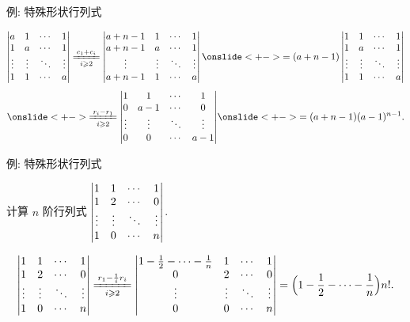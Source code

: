 \begin{frame}{例: 特殊形状行列式}
	\onslide<+->
	\begin{solution}
		\[\detm{
			a&1&\cdots&1\\
			1&a&\cdots&1\\
			\vdots&\vdots&\ddots&\vdots\\
			1&1&\cdots&a
		}\xeq[i\ge2]{c_1+c_i}\detm{
			a+n-1&1&\cdots&1\\
			a+n-1&a&\cdots&1\\
			\vdots&\vdots&\ddots&\vdots\\
			a+n-1&1&\cdots&a
		}
		\onslide<+->{=(a+n-1)\detm{
			1&1&\cdots&1\\
			1&a&\cdots&1\\
			\vdots&\vdots&\ddots&\vdots\\
			1&1&\cdots&a
		}}\]\[
		\onslide<+->{\xeq[i\ge2]{r_i-r_1}\detm{
			1&1&\cdots&1\\
			0&a-1&\cdots&0\\
			\vdots&\vdots&\ddots&\vdots\\
			0&0&\cdots&a-1
		}}
		\onslide<+->{=(a+n-1)(a-1)^{n-1}.}
		\]
	\end{solution}
\end{frame}


\begin{frame}{例: 特殊形状行列式}
	\onslide<+->
	\begin{example}
		计算 $n$ 阶行列式 $\left|\begin{matrix}
			1&1&\cdots&1\\
			1&2&\cdots&0\\
			\vdots&\vdots&\ddots&\vdots\\
			1&0&\cdots&n
		\end{matrix}\right|$.
	\end{example}
	\onslide<+->
	\begin{solution}
		\[\detm{
			1&1&\cdots&1\\
			1&2&\cdots&0\\
			\vdots&\vdots&\ddots&\vdots\\
			1&0&\cdots&n
		}\xeq[i\ge 2]{r_1-\frac1i r_i}
		\detm{
			1-\frac12-\cdots-\frac1n&1&\cdots&1\\
			0&2&\cdots&0\\
			\vdots&\vdots&\ddots&\vdots\\
			0&0&\cdots&n
		}
		=\Bigl(1-\frac12-\cdots-\frac1n\Bigr)n!.\]
	\end{solution}
\end{frame}


